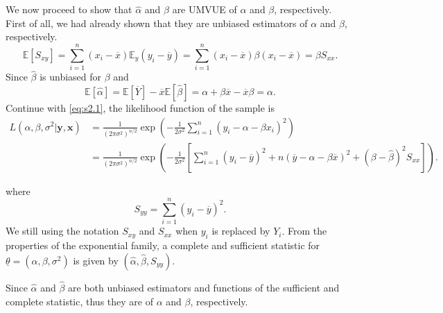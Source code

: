 \begin{example}
We now proceed to show that $\widehat{\alpha}$ and $\widehat{\beta}$ are UMVUE of $\alpha$ and $\beta$, respectively. First of all, 
we had already shown that they are unbiased estimators of $\alpha$ and $\beta$, respectively.
\[
    \mathbb{E}[S_{xy}] = \sum^n_{i=1} (x_i - \overline{x}) \mathbb{E}_y(y_i - \overline{y}) = \sum^n_{i=1} (x_i - \overline{x}) \beta (x_i - \overline{x}) =  \beta S_{xx}.
\]
Since $\widehat{\beta}$ is unbiased for $\beta$ and 
\[
    \mathbb{E}[\widehat{\alpha}] = \mathbb{E}[\overline{Y}] - \overline{x} \mathbb{E}[\widehat{\beta}] = \alpha + \beta \overline{x} - \overline{x} \beta = \alpha.
\]
Continue with \eqref{eq:s2.1}, the likelihood function of the sample is
\begin{align*}
    L(\alpha, \beta, \sigma^2 | \mathbf{y}, \mathbf{x}) &= \frac{1}{(2\pi\sigma^2)^{n/2}} \exp\left(-\frac{1}{2\sigma^2} \sum_{i=1}^n (y_i - \alpha - \beta x_i)^2\right)\\
    &= \frac{1}{(2\pi\sigma^2)^{n/2}} \exp\left(-\frac{1}{2\sigma^2} \left[ \sum_{i=1}^n (y_i - \overline{y})^2 + n(\overline{y} - \alpha - \beta \overline{x})^2 + (\beta - \widehat{\beta})^2 S_{xx} \right] \right).
\end{align*}

where 
\[
    S_{yy} = \sum_{i=1}^n (y_i - \overline{y})^2.
\]
We still using the notation $S_{xy}$ and $S_{xx}$ when $y_i$ is replaced by $Y_i$. From the properties of the exponential family, a complete and sufficient
statistic for $\underline{\theta} = (\alpha, \beta, \sigma^2)$ is given by $(\widehat{\alpha}, \widehat{\beta}, S_{yy})$.

Since $\widehat{\alpha}$ and $\widehat{\beta}$ are both unbiased estimators and functions of the sufficient and complete 
statistic, thus they are  of $\alpha$ and $\beta$, respectively.

\end{example}
